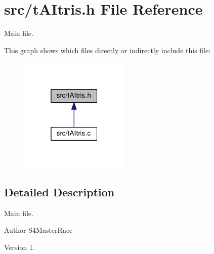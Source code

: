 \section{src/t\+A\+Itris.h File Reference}
\label{tAItris_8h}


Main file.  


This graph shows which files directly or indirectly include this file\+:
\nopagebreak
\begin{figure}[H]
\begin{center}
\leavevmode
\includegraphics[width=148pt]{tAItris_8h__dep__incl}
\end{center}
\end{figure}


\subsection{Detailed Description}
Main file. 

\begin{DoxyAuthor}{Author}
S4\+Master\+Race 
\end{DoxyAuthor}
\begin{DoxyVersion}{Version}
1. 
\end{DoxyVersion}
